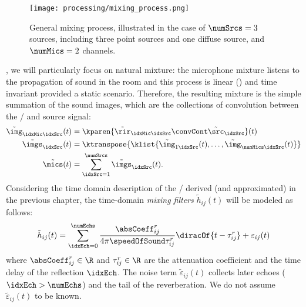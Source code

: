 \begin{figure}[t]
    \begin{fullwidth}
        \texttt{[image: processing/mixing\_process.png]}

        \caption{General mixing process, illustrated in the case of $\numSrcs = 3$ sources,
        including three point sources and one diffuse source, and $\numMics = 2$ channels.}

        \label{fig:processing:mixing}
    \end{fullwidth}
\end{figure}

, we will particularly focus on natural mixture:
the microphone mixture listens to the propagation of sound in the room and this process is linear () and time invariant provided a static scenario.
Therefore, the resulting mixture is the simple summation of the sound images,
which are the collections of convolution between the \RIRs/ and source signal:
\begin{align}
    \tilde{\img}_{\idxMic\idxSrc}(t) &= \kparen{\tilde{\rir}_{\idxMic\idxSrc} \convCont \tilde{\src}_\idxSrc} (t)     \label{eq:processing:mixing:img} \\
    \tilde{\imgs}_\idxSrc(t)         &= \ktranspose{\klist{\tilde{\img}_{1\idxSrc}(t), \dots, \tilde{\img}_{\numMics\idxSrc}(t)}} \nonumber\\
    \tilde{\mics}(t)                 &= \sum_{\idxSrc=1}^{\numSrcs} \tilde{\imgs}_\idxSrc(t)                    \label{eq:processing:mixing:mix}
    .
\end{align}%
Considering the time domain description of the \RIR/ derived (and approximated) in the previous chapter,
the time-domain \emph{mixing filters} $\tilde{h}_{ij}( t)$ will be modeled as follows:
\begin{equation}\label{eq:processing:mixing_filter}
    \tilde{h}_{ij}( t) = \sum_{\idxEch=0}^{\numEchs} \frac{\absCoeff_{ij}^r}{4 \pi \speedOfSound \tau_{ij}^r}
                          \diracOf{t - \tau_{ij}^r} + \varepsilon_{ij}(t)
\end{equation}
where $\absCoeff_{ij}^r \in \R$ and $\tau_{ij}^r \in \R$ are the attenuation coefficient and the time delay of the reflection $\idxEch$.
The noise term $\tilde{\varepsilon}_{ij}( t)$ collects later echoes ($\idxEch > \numEchs$) and the tail of the reverberation.
We do not assume $\tilde{\varepsilon}_{ij}( t)$ to be known.

